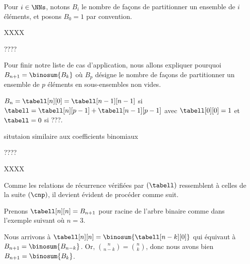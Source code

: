 Pour $i \in \NNs$, notons $B_i$ le nombre de façons de partitionner un ensemble de $i$ éléments, et posons $B_0 = 1$ par convention.

XXXX

????

Pour finir notre liste de cas d'application, nous allons expliquer pourquoi $B_{n+1} = \binosum{B_k}$ où $B_p$ désigne le nombre de façons de partitionner un ensemble de $p$ éléments en sous-ensembles non vides.

$B_n = \tabell[n][0] = \tabell[n-1][n-1]$
si
$\tabell = \tabell[n][p-1] + \tabell[n-1][p-1]$
avec
$\tabell[0][0] = 1$
et
$\tabell = 0$
si ???.

situtaion similaire aux coefficients binomiaux 

????

XXXX


Comme les relations de récurrence vérifiées par $(\tabell)$ ressemblent à celles de la suite $(\cnp)$,
il devient évident de procéder comme suit.

\explaintree{\tabell}{\tabell[n][p-1]}{\tabell[n-1][p-1]}%
            {\bellintertree}{}

Prenons $\tabell[n][n] = B_{n+1}$ pour racine de l'arbre binaire comme dans l'exemple suivant où $n = 3$.


Nous arrivons à
$\tabell[n][n] = \binosum{\tabell[n-k][0]}$
qui équivaut à
$B_{n+1} = \binosum{B_{n-k}}$.
Or, $\binom{n}{n-k} = \binom{n}{k}$, donc nous avons bien 
$B_{n+1} = \binosum{B_k}$.